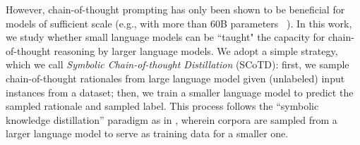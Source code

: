 \documentclass[11pt]{article}
\newcommand\harold[1]{{\color{gray}[#1]$_{harold}$}}
\begin{document}

However, chain-of-thought prompting has only been shown to be beneficial for models of sufficient scale (e.g., with more than 60B parameters ~\cite{wei2022chain}). %
In this work, we study whether small language models can be ``taught" the capacity for chain-of-thought reasoning %
by larger language models. %
We adopt a simple strategy, which we call \emph{Symbolic Chain-of-thought Distillation} (SCoTD): first, we sample chain-of-thought rationales from large language model given (unlabeled) input instances from a dataset; then, we train a smaller language model to predict the sampled rationale and sampled label. This process follows the ``symbolic knowledge distillation'' paradigm as in \citet{west2021symbolic}, wherein corpora are sampled from a larger language model to serve as training data for a smaller one.%
\end{document}
